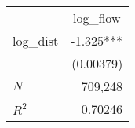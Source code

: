 \begin{tabular}{lr}
\toprule
          & \multicolumn{1}{c}{log\_flow} \\ 
\cmidrule(lr){2-2} 
log\_dist &                     -1.325*** \\ 
          &                     (0.00379) \\ 
\midrule
$N$       &                       709,248 \\ 
$R^2$     &                       0.70246 \\ 
\bottomrule
\end{tabular}
